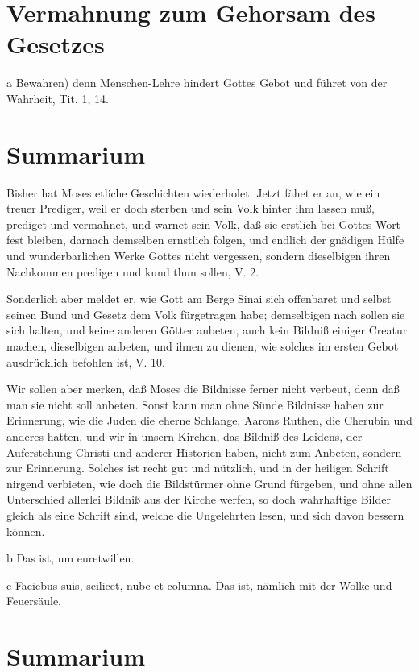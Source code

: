 \section{Vermahnung zum Gehorsam des Gesetzes}

a Bewahren) denn Menschen-Lehre hindert Gottes Gebot und führet von der Wahrheit, Tit. 1, 14.

\section{Summarium}

Bisher hat Moses etliche Geschichten wiederholet. Jetzt fähet er an, wie ein treuer Prediger, weil er doch sterben und sein Volk hinter ihm lassen muß, prediget und vermahnet, und warnet sein Volk, daß sie erstlich bei Gottes Wort fest bleiben, darnach demselben ernstlich folgen, und endlich der gnädigen Hülfe und wunderbarlichen Werke Gottes nicht vergessen, sondern dieselbigen ihren Nachkommen predigen und kund thun sollen, V. 2.

Sonderlich aber meldet er, wie Gott am Berge Sinai sich offenbaret und selbst seinen Bund und Gesetz dem Volk fürgetragen habe; demselbigen nach sollen sie sich halten, und keine anderen Götter anbeten, auch kein Bildniß einiger Creatur machen, dieselbigen anbeten, und ihnen zu dienen, wie solches im ersten Gebot ausdrücklich befohlen ist, V. 10.

Wir sollen aber merken, daß Moses die Bildnisse ferner nicht verbeut, denn daß man sie nicht soll anbeten. Sonst kann man ohne Sünde Bildnisse haben zur Erinnerung, wie die Juden die eherne Schlange, Aarons Ruthen, die Cherubin und anderes hatten, und wir in unsern Kirchen, das Bildniß des Leidens, der Auferstehung Christi und anderer Historien haben, nicht zum Anbeten, sondern zur Erinnerung. Solches ist recht gut und nützlich, und in der
heiligen Schrift nirgend verbieten, wie doch die Bildstürmer ohne Grund fürgeben, und ohne allen Unterschied allerlei Bildniß aus der Kirche werfen, so doch wahrhaftige Bilder gleich als eine Schrift sind, welche die Ungelehrten lesen, und sich davon bessern können.

b Das ist, um euretwillen.

c Faciebus suis, scilicet, nube et columna. Das ist, nämlich mit der Wolke und Feuersäule.

\section{Summarium}

